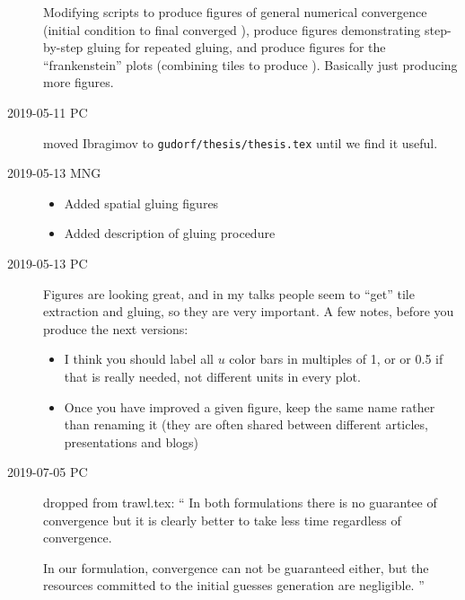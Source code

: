 \begin{description}
Modifying scripts to produce figures of general numerical convergence
(initial condition to final converged \twot), produce figures
demonstrating step-by-step gluing for repeated gluing,
and produce figures for the ``frankenstein'' plots (combining tiles
to produce \twots). Basically just producing more figures.

\item[2019-05-11 PC]
moved Ibragimov to \texttt{gudorf/thesis/thesis.tex} until we find it useful.

\item[2019-05-13 MNG]
\begin{itemize}
\item Added spatial gluing figures
\item Added description of gluing procedure
\end{itemize}

\item[2019-05-13 PC]
Figures are looking great, and in my talks people seem to ``get'' tile
extraction and gluing, so they are very important. A few notes, before you
produce the next versions:
\begin{itemize}
%
%
  \item
I think you should label all $u$ color bars in multiples of 1, or
or 0.5 if that is really needed, not different units in every plot.
  \item
Once you have improved a given figure,
keep the same name rather than renaming it
(they are often shared between different articles, presentations and blogs)
\end{itemize}

\item[2019-07-05 PC] dropped from trawl.tex: ``
In both formulations there is no guarantee of convergence
but it is clearly better to take less time regardless of convergence.

In our formulation, convergence can not be guaranteed either, but the
resources committed to the initial guesses generation are negligible.
''


\end{description}
